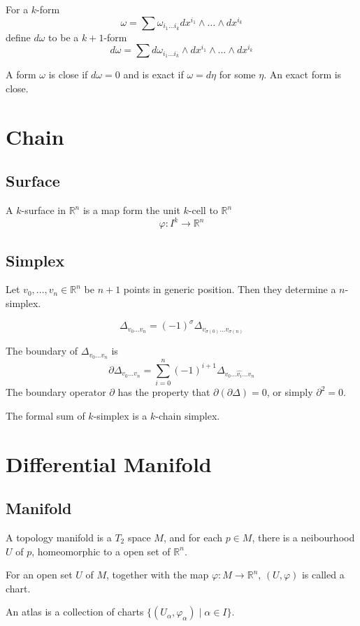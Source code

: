 For a $k$-form $$\omega = \sum \omega_{i_1\dots i_k} dx^{i_1} \wedge \dots \wedge dx^{i_k}$$
define $d \omega$ to be a $k+1$-form
$$d \omega = \sum d\omega_{i_1\dots i_k} \wedge dx^{i_1} \wedge \dots \wedge dx^{i_k}$$


A form $\omega$ is close if $d \omega = 0$ and is exact if $\omega = d \eta$ for some $\eta$.
An exact form is close.

\section{Chain}

\subsection{Surface}
A $k$-surface in $\mathbb{R}^n$ is a map form the unit $k$-cell to $\mathbb{R}^n$
$$\varphi: I^k \to \mathbb{R}^n$$

\subsection{Simplex}
Let $v_0, \dots, v_n \in \mathbb R^n$ be $n + 1$ points in generic position.
Then they determine a $n$-simplex.

$$\Delta_{v_0\dots v_n} = (-1)^\sigma \Delta_{v_{\sigma(0)}\dots v_{\sigma(n)}}$$

The boundary of $\Delta_{v_0\dots v_n}$ is
$$\partial \Delta_{v_0\dots v_n} = \sum_{i=0}^n (-1)^{i + 1} \Delta_{v_0 \dots \widehat{v_i} \dots v_n}$$
The boundary operator $\partial$ has the property that $\partial(\partial \Delta) = 0$,
or simply $\partial^2 = 0$.

The formal sum of $k$-simplex is a $k$-chain simplex.


\section{Differential Manifold}

\subsection{Manifold}
A topology manifold is a $T_2$ space $M$, and for each $p \in M$,
there is a neibourhood $U$ of $p$, homeomorphic to a open set of $\mathbb R^n$.

For an open set $U$ of $M$, together with the map $\varphi : M \to \mathbb R^n$,
$(U, \varphi)$ is called a chart.

An atlas is a collection of charts $\{(U_\alpha, \varphi_\alpha) \mid \alpha \in I\}$.

